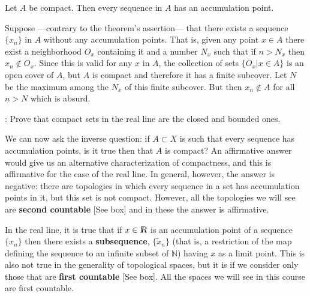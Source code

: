 \espa

\bteo
Let $A$ be compact. Then every sequence in $A$ has an accumulation point.
\eteo

\espa

\bpru
Suppose ---contrary to the theorem's assertion--- that
there exists a sequence $\{x_n\}$ in $A$ without any accumulation points.
That is, given any point $x \in A$ there exist a neighborhood $O_x$
containing it and a number $N_x$ such that if $n > N_x$ then $x_n \notin
O_x$. Since this is valid for any $x$ in $A$, the collection of
sets $\{ O_x | x \in A \}$ is an open cover of $A$, but $A$ is compact and therefore
it has a finite subcover.
Let $N$ be the maximum among the $N_x$ of this finite subcover. But then
$x_n \notin A$ for all $n > N$ which is absurd.  
\epru

\ejer: Prove that compact sets in the real line are the
closed and bounded ones.


We can now ask the inverse question: if $A \subset X$ is
such that every sequence has accumulation points, is it true
then that $A$ is compact? An affirmative answer would give us
an alternative characterization of compactness, and this is
affirmative for the case of the real line. In general, however, the answer is
negative: there are topologies in which every sequence in a
set has accumulation points in it, but this set is not
compact. However, all the topologies we will see are {\bf second countable} [See box] and in these
the answer is affirmative.

In the real line, it is true that if $x \in \mbox{\sl {l$\!\!\!\;\:\!$R}} $ is an accumulation point of a sequence $\{x_n\}$ then there exists a {\bf
subsequence}, $\{\tilde{x}_n\}$ (that is, a restriction of the
map defining the sequence to an infinite subset of $\mathbb{N}$) having $x$ as a limit point. This is also not
true in the generality of topological spaces, but it is if we consider only those that are {\bf first countable} [See box]. All the spaces we will see in this
course are first countable.

\espa 
\vfill   %

